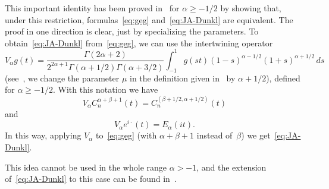 \documentclass[12pt,a4paper]{amsart}
\theoremstyle{plain}
\theoremstyle{definition}
\newtheorem*{Rem}{Remark}
\begin{document}
This important identity has been proved in~\cite{Rosler} for $\alpha\ge -1/2$ 
by showing that, under this restriction, formulas~\eqref{eq:geg} and~\eqref{eq:JA-Dunkl} 
are equivalent. The proof in one direction is clear, just by specializing the parameters. 
To obtain~\eqref{eq:JA-Dunkl} from~\eqref{eq:geg}, we can use the intertwining operator
\begin{equation*}
  V_\alpha g(t) = \frac{\Gamma(2\alpha+2)}{2^{2\alpha+1} \Gamma(\alpha+1/2)\Gamma(\alpha+3/2)}
  \int_{-1}^1 g(st) (1-s)^{\alpha-1/2} (1+s)^{\alpha+1/2}\,ds
\end{equation*}
(see~\cite[Definition~1.5.1, p.~24]{DX}, we change the parameter $\mu$ 
in the definition given in~\cite{DX} by $\alpha+1/2$), defined for $\alpha\ge -1/2$. 
With this notation we have
\begin{equation*}
  V_\alpha C_n^{\alpha+\beta+1}(t) = C_n^{(\beta+1/2,\alpha+1/2)}(t)
\end{equation*}
and
\begin{equation*}
  V_\alpha e^{i\cdot}(t) = E_\alpha(it).
\end{equation*}
In this way, applying $V_\alpha$ to~\eqref{eq:geg} 
(with $\alpha+\beta+1$ instead of~$\beta$) we get~\eqref{eq:JA-Dunkl}.

This idea cannot be used in the whole range $\alpha>-1$, 
and the extension of~\eqref{eq:JA-Dunkl} to this case can be found in~\cite{ACV}.

\end{document}
